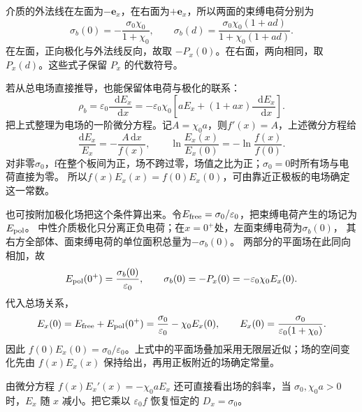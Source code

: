\documentclass[UTF8,fontset=fandol,a4paper,11pt]{ctexart}
\newcommand{\dd}{\mathop{}\!\mathrm{d}}
\newcommand{\vect}[1]{\bm{#1}}
\newcommand{\result}[1]{\begin{equation*}\boxed{#1}\end{equation*}}
\begin{document}
介质的外法线在左面为$-\vect e_x$，在右面为$+\vect e_x$，所以两面的束缚电荷分别为
\result{\sigma_b(0)=-\frac{\sigma_0\chi_0}{1+\chi_0},\qquad
\sigma_b(d)=\frac{\sigma_0\chi_0(1+ad)}{1+\chi_0(1+ad)}.}
在左面，正向极化与外法线反向，故取 $-P_x(0)$。在右面，两向相同，取 $P_x(d)$。这些式子保留 $P_x$ 的代数符号。

若从总电场直接推导，也能保留体电荷与极化的联系：
\[\rho_b=\varepsilon_0\frac{\dd E_x}{\dd x}
=-\varepsilon_0\chi_0\left[aE_x+(1+ax)\frac{\dd E_x}{\dd x}\right].
\]
把上式整理为电场的一阶微分方程。记$A=\chi_0a$，则$f'(x)=A$，上述微分方程给
\[
\frac{\mathrm dE_x}{E_x}=-\frac{A\,\mathrm dx}{f(x)},\qquad
\ln\frac{E_x(x)}{E_x(0)}
=-\ln\frac{f(x)}{f(0)}.
\]
对非零$\sigma_0$，f在整个板间为正，场不跨过零，场值之比为正；$\sigma_0=0$时所有场与电荷直接为零。
所以$f(x)E_x(x)=f(0)E_x(0)$，可由靠近正极板的电场确定这一常数。

也可按附加极化场把这个条件算出来。令$E_{\rm free}=\sigma_0/\varepsilon_0$，把束缚电荷产生的场记为$E_{\rm pol}$。
中性介质极化只分离正负电荷；在$x=0^+$处，左面束缚电荷为$\sigma_b(0)$，
其右方全部体、面束缚电荷的单位面积总量为$-\sigma_b(0)$。
两部分的平面场在此同向相加，故
\[
E_{\rm pol}(0^+)=\frac{\sigma_b(0)}{\varepsilon_0},\qquad
\sigma_b(0)=-P_x(0)=-\varepsilon_0\chi_0E_x(0).
\]
代入总场关系，
\[
E_x(0)=E_{\rm free}+E_{\rm pol}(0^+)
=\frac{\sigma_0}{\varepsilon_0}-\chi_0E_x(0),
\qquad
E_x(0)=\frac{\sigma_0}{\varepsilon_0(1+\chi_0)}.
\]
因此 $f(0)E_x(0)=\sigma_0/\varepsilon_0$。上式中的平面场叠加采用无限层近似；场的空间变化先由 $f(x)E_x(x)$ 保持给出，再用正板附近的场确定常量。

由微分方程 $f(x)E_x'(x)=-\chi_0aE_x$ 还可直接看出场的斜率，当 $\sigma_0,\chi_0a>0$ 时，$E_x$ 随 $x$ 减小。把它乘以 $\varepsilon_0 f$ 恢复恒定的 $D_x=\sigma_0$。
\end{document}
